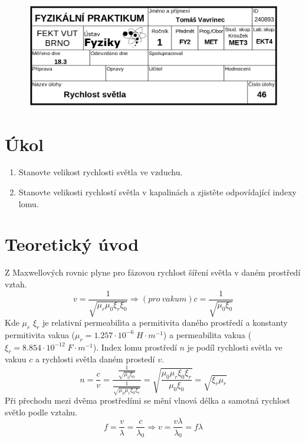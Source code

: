 \documentclass{article}
\begin{document}
\small
\vspace{20mm}
\begin{figure}[H] 	
    \centering 	
    \includegraphics[width=\textwidth]{tabulka.jpg}
\end{figure}

\section{Úkol}
\begin{enumerate}
    \item Stanovte velikost rychlosti světla ve vzduchu.
    \item Stanovte velikosti rychlostí světla v kapalinách a zjistěte odpovídající indexy lomu.
\end{enumerate}

\section{Teoretický úvod}
Z Maxwellových rovnic plyne pro fázovou rychlost šíření světla v daném prostředí vztah.
\begin{equation}
    v=\frac{1}{\sqrt{\mu_r\mu_0\xi_r\xi_0}} \Rightarrow (pro~vakum) c=\frac{1}{\sqrt{\mu_0\xi_0}}
    \label{frek}
\end{equation}
Kde \(\mu_r\) \(\xi_r\) je relativní permeabilita a permitivita daného prostředí a konstanty permitivita vakua (\(\mu_r=1.257\cdot10^{-6}\;H\cdot m^{-1}\)) a permeabilita vakua (\(\xi_r=8.854\cdot10^{-12}\;F\cdot m^{-1}\)).
Index lomu prostředí \(n\) je podíl rychlosti světla ve vakuu \(c\) a rychlosti světla daném prostedí \(v\).
\begin{equation}
    n=\frac{c}{v}=\frac{\frac{1}{\sqrt{\mu_0\xi_0}}}{\frac{1}{\sqrt{\mu_0\mu_r\xi_0\xi_r}}}=\sqrt{\frac{\mu_0\mu_r\xi_0\xi_r}{\mu_0\xi_0}}=\sqrt{\xi_r\mu_r}
    \label{V-b0}
\end{equation}
Při přechodu mezi dvěma prostředími se mění vlnová délka a samotná rychlost světlo podle vztahu. 
\begin{equation}
    f=\frac{v}{\lambda }=\frac{c }{\lambda_0} \Rightarrow v=\frac{v \lambda}{\lambda_0}=f\lambda
    \label{F-vl}
\end{equation}
\end{document}
